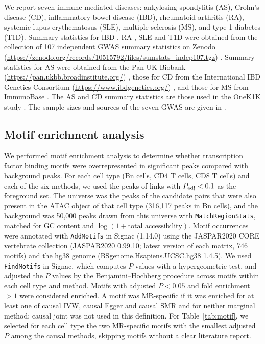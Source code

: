 \noindent We report seven immune-mediated diseases: ankylosing spondylitis (AS), Crohn's disease (CD), inflammatory bowel disease (IBD), rheumatoid arthritis (RA), systemic lupus erythematosus (SLE), multiple sclerosis (MS), and type 1 diabetes (T1D). Summary statistics for IBD \cite{delange2017ibd}, RA \cite{saevarsdottir2022ra}, SLE \cite{bentham2015sle} and T1D \cite{chiou2021t1d} were obtained from the collection of 107 independent GWAS summary statistics on Zenodo (\url{https://zenodo.org/records/10515792/files/sumstats_indep107.tgz}) \cite{gazal2024sldscref}. Summary statistics for AS were obtained from the Pan-UK Biobank (\url{https://pan.ukbb.broadinstitute.org/}) \cite{karczewski2025panukb}, those for CD from the International IBD Genetics Consortium (\url{https://www.ibdgenetics.org/}) \cite{liu2015ibd}, and those for MS from ImmunoBase \cite{sawcer2011ms}. The AS and CD summary statistics are those used in the OneK1K study \cite{yazar2022onek1k}. The sample sizes and sources of the seven GWAS are given in .


\subsection{Motif enrichment analysis}
\label{sec:motif}
We performed motif enrichment analysis to determine whether transcription factor binding motifs were overrepresented in significant peaks compared with background peaks. For each cell type (Bn cells, CD4 T cells, CD8 T cells) and each of the six methods, we used the peaks of links with $P_{\mathrm{adj}}<0.1$ as the foreground set. The universe was the peaks of the candidate pairs that were also present in the ATAC object of that cell type (316,117 peaks in Bn cells), and the background was 50,000 peaks drawn from this universe with \texttt{MatchRegionStats}, matched for GC content and $\log(1+\text{total accessibility})$. Motif occurrences were annotated with \texttt{AddMotifs} in Signac (1.14.0) \cite{stuart2021signac} using the JASPAR2020 CORE vertebrate collection (JASPAR2020 0.99.10; latest version of each matrix, 746 motifs) \cite{fornes2020jaspar} and the hg38 genome (BSgenome.Hsapiens.UCSC.hg38 1.4.5). We used \texttt{FindMotifs} in Signac, which computes $P$ values with a hypergeometric test, and adjusted the $P$ values by the Benjamini--Hochberg procedure across motifs within each cell type and method. Motifs with adjusted $P<0.05$ and fold enrichment $>1$ were considered enriched. A motif was MR-specific if it was enriched for at least one of causal IVW, causal Egger and causal SMR and for neither marginal method; causal joint was not used in this definition. For Table~\ref{tab:motif}, we selected for each cell type the two MR-specific motifs with the smallest adjusted $P$ among the causal methods, skipping motifs without a clear literature report.


